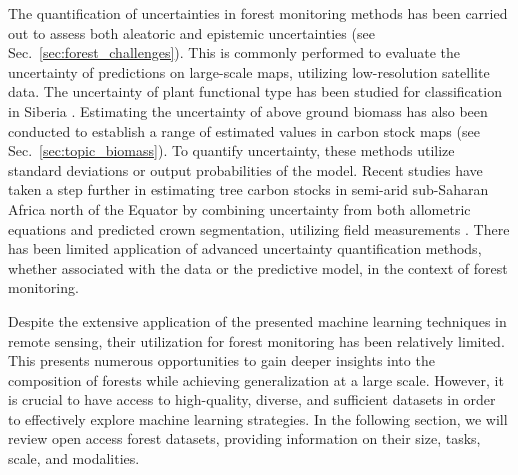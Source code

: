 \documentclass{CUP-JNL-DTM}%
\theoremstyle{definition}
\numberwithin{equation}{section}
\begin{document}
%
The quantification of uncertainties in forest monitoring methods has been carried out to assess both aleatoric and epistemic uncertainties (see Sec.~\ref{sec:forest_challenges}). This is commonly performed to evaluate the uncertainty of predictions on large-scale maps, utilizing low-resolution satellite data.
%
The uncertainty of plant functional type has been studied for classification in Siberia \cite{ottle_use_2013}.
%
Estimating the uncertainty of above ground biomass has also been conducted to establish a range of estimated values in carbon stock maps \cite{patterson_statistical_2019, santoro_global_2021} (see Sec.~\ref{sec:topic_biomass}).
%
To quantify uncertainty, these methods utilize standard deviations or output probabilities of the model.
Recent studies have taken a step further in estimating tree carbon stocks in semi-arid sub-Saharan Africa north of the Equator by combining uncertainty from both allometric equations and predicted crown segmentation, utilizing field measurements \cite{tucker_sub-continental-scale_2023}. 
%
There has been limited application of advanced uncertainty quantification methods, whether associated with the data or the predictive model, in the context of forest monitoring.

Despite the extensive application of the presented machine learning techniques in remote sensing, their utilization for forest monitoring has been relatively limited. 
This presents numerous opportunities to gain deeper insights into the composition of forests while achieving generalization at a large scale. 
However, it is crucial to have access to high-quality, diverse, and sufficient datasets in order to effectively explore machine learning strategies. 
In the following section, we will review open access forest datasets, providing information on their size, tasks, scale, and modalities.
\end{document}
